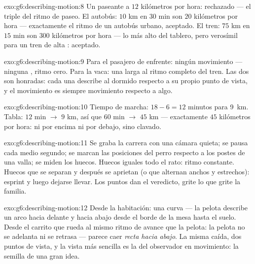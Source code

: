 \begin{solution}{exo:g6:describing-motion:8}
Un paseante a $12$ kilómetros por hora: rechazado --- el triple del
ritmo de paseo. El autobús: $10$ km en $30$ min son $20$ kilómetros
por hora --- exactamente el ritmo de un autobús urbano, aceptado. El
tren: $75$ km en $15$ min son $300$ kilómetros por hora --- lo más
alto del tablero, pero verosímil para un tren de alta :
aceptado.
\end{solution}

\begin{solution}{exo:g6:describing-motion:9}
Para el pasajero de enfrente: ningún movimiento --- ninguna
, ritmo cero. Para la vaca: una larga
 al ritmo completo del tren. Las dos son
honradas: cada una describe al dormido respecto a su propio punto de
vista, y el movimiento es siempre movimiento respecto a algo.
\end{solution}

\begin{solution}{exo:g6:describing-motion:10}
Tiempo de marcha: $18 - 6 = 12$ minutos para \qty{9}{km}. Tabla: $12$
min $\to$ $9$ km, así que $60$ min $\to$ $45$ km --- exactamente $45$
kilómetros por hora: ni por encima ni por debajo, sino clavado.
\end{solution}

\begin{solution}{exo:g6:describing-motion:11}
Se graba la carrera con una cámara quieta; se pausa cada medio
segundo; se marcan las posiciones del perro respecto a los postes de
una valla; se miden los huecos. Huecos iguales todo el rato: ritmo
constante. Huecos que se separan y después se aprietan (o que alternan
anchos y estrechos): esprint y luego dejarse llevar. Los puntos dan el
veredicto, grite lo que grite la familia.
\end{solution}

\begin{solution}{exo:g6:describing-motion:12}
Desde la habitación: una curva --- la pelota describe un arco hacia
delante y hacia abajo desde el borde de la mesa hasta el suelo. Desde
el carrito que rueda al mismo ritmo de avance que la pelota: la pelota
no se adelanta ni se retrasa --- parece caer \emph{recta hacia abajo}.
La misma caída, dos puntos de vista, y la vista más sencilla es la del
observador en movimiento: la semilla de una gran idea.
\end{solution}

